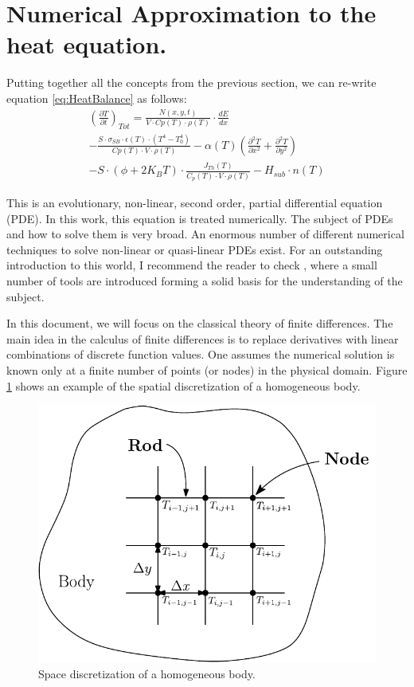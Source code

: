 \section{Numerical Approximation to the heat equation.}
\label{sec:NumericalMethod}

Putting together all the concepts from the previous section, we can re-write equation \ref{eq:HeatBalance} as follows: 
\begin{multline}
    \left(\frac{\partial T}{\partial t}\right)_{Tot} = 
    \frac{N(x,y,t)}{V\cdot Cp(T) \cdot \rho (T) }\cdot \frac{dE}{dx} \\
    - \frac{S\cdot \sigma_{SB}\cdot \epsilon(T)\cdot \left(T^4 - T_0^4\right)}{Cp(T)\cdot V \cdot \rho(T)} 
        -\alpha (T) \left( \frac{\partial^2 T}{\partial x^2} + \frac{\partial^2 T}{\partial y^2} \right)  \\
        - S\cdot \left( \phi +2K_B T\right)\cdot \frac{J_{Th}(T)}{C_p(T)\cdot V \cdot \rho(T)} - H_{sub} \cdot n(T)
    \label{eq:ExplicitHeatEq}
\end{multline}

This is an evolutionary, non-linear, second order, partial differential equation (PDE). In this work, this equation is treated numerically. The subject of PDEs and how to solve them is very broad. An enormous number of different numerical techniques to solve non-linear or quasi-linear PDEs exist. For an outstanding introduction to this world, I recommend the reader to check \parencite[][]{ref:NumericalMethodBook}, where a small number of tools are introduced forming a solid basis for the understanding of the subject. 

In this document, we will focus on the classical theory of finite differences. The main idea in the calculus of finite differences is to replace derivatives with linear combinations of discrete function values. One assumes the numerical solution is known only at a finite number of points (or nodes) in the physical domain. Figure \ref{fig:SpaceDiscret} shows an example of the spatial discretization of a homogeneous body. 

\begin{figure}[h]
    \centering
    \includegraphics[width=0.5\columnwidth]{SpaceDiscretization/SpaceDiscretization.pdf}
    \caption{Space discretization of a homogeneous body.}
    \label{fig:SpaceDiscret}
\end{figure}


